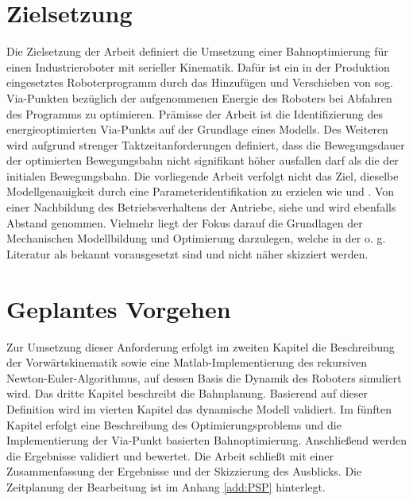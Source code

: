 \section{Zielsetzung}
Die Zielsetzung der Arbeit definiert die Umsetzung einer Bahnoptimierung für einen Industrieroboter mit serieller Kinematik. Dafür ist ein in der Produktion eingesetztes Roboterprogramm durch das Hinzufügen und Verschieben von sog. Via-Punkten bezüglich
der aufgenommenen Energie des Roboters bei Abfahren des Programms zu optimieren. Prämisse der Arbeit ist die Identifizierung des energieoptimierten Via-Punkts auf der Grundlage eines Modells. Des Weiteren wird aufgrund strenger Taktzeitanforderungen definiert, dass die Bewegungsdauer der optimierten Bewegungsbahn nicht signifikant höher ausfallen darf als die der initialen Bewegungsbahn. Die vorliegende Arbeit verfolgt nicht das Ziel, dieselbe Modellgenauigkeit durch eine Parameteridentifikation zu erzielen wie \cite{Pellicciari.2011} und \cite{Gattringer.2013}. Von einer Nachbildung des Betriebsverhaltens der Antriebe, siehe \cite{Eggers.2019} und \cite{Ziaukas.2017} wird ebenfalls Abstand genommen. Vielmehr liegt der Fokus darauf die Grundlagen der Mechanischen Modellbildung und Optimierung darzulegen, welche in der o. g. Literatur als bekannt vorausgesetzt sind und nicht näher skizziert werden. 	
\section{Geplantes Vorgehen}
Zur Umsetzung dieser Anforderung erfolgt im zweiten Kapitel die Beschreibung der Vorwärtskinematik sowie eine Matlab-Implementierung des rekursiven Newton-Euler-Algorithmus, auf dessen Basis die Dynamik des Roboters simuliert wird. Das dritte Kapitel beschreibt die Bahnplanung.  Basierend auf dieser Definition wird im vierten Kapitel das dynamische Modell validiert. Im fünften Kapitel erfolgt eine Beschreibung des Optimierungsproblems und die Implementierung der Via-Punkt basierten Bahnoptimierung. Anschließend werden die Ergebnisse validiert und bewertet. Die Arbeit schließt mit einer Zusammenfassung der Ergebnisse und der Skizzierung des Ausblicks. 
Die Zeitplanung der Bearbeitung ist im Anhang \ref{add:PSP} hinterlegt.